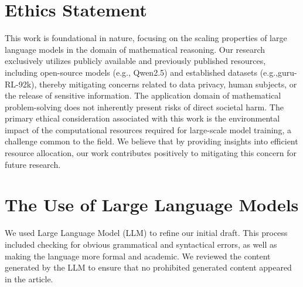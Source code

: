 \section{Ethics Statement}
This work is foundational in nature, focusing on the scaling properties of large language models in the domain of mathematical reasoning. Our research exclusively utilizes publicly available and previously published resources, including open-source models (e.g., Qwen2.5) and established datasets (e.g.,guru-RL-92k), thereby mitigating concerns related to data privacy, human subjects, or the release of sensitive information. The application domain of mathematical problem-solving does not inherently present risks of direct societal harm. The primary ethical consideration associated with this work is the environmental impact of the computational resources required for large-scale model training, a challenge common to the field. We believe that by providing insights into efficient resource allocation, our work contributes positively to mitigating this concern for future research.
\section{The Use of Large Language Models}
We used Large Language Model (LLM) to refine our initial draft. This process included checking for obvious grammatical and syntactical errors, as well as making the language more formal and academic. We reviewed the content generated by the LLM to ensure that no prohibited generated content appeared in the article.